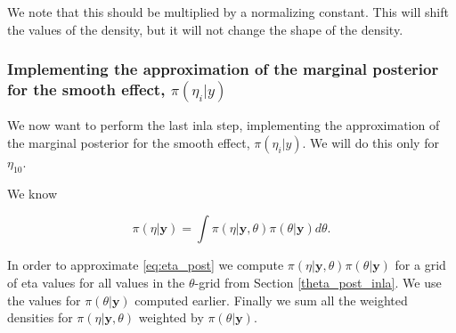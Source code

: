 We note that this should be multiplied by a normalizing constant. This will shift the values of the density, but it will not change the shape of the density. 

\subsubsection{Implementing the approximation of the marginal posterior for the smooth effect, $\pi(\eta_i | y)$}

We now want to perform the last inla step, implementing the approximation of the marginal posterior for the smooth effect, $\pi(\eta_i | y)$. We will do this only for $\eta_{10}$. 

We know 

\begin{equation}
\label{eq:eta_post}
    \pi(\eta|\boldsymbol{y}) = \int \pi(\eta|\boldsymbol{y}, \theta) \pi(\theta|\boldsymbol{y}) d\theta.
\end{equation}

In order to approximate \eqref{eq:eta_post} we compute $\pi(\eta|\boldsymbol{y}, \theta) \pi(\theta|\boldsymbol{y})$ for a grid of eta values for all values in the $\theta$-grid from Section \ref{theta_post_inla}. We use the values for $\pi(\theta|\boldsymbol{y})$ computed earlier. Finally we sum all the weighted densities for $\pi(\eta|\boldsymbol{y}, \theta)$ weighted by $\pi(\theta|\boldsymbol{y})$.







